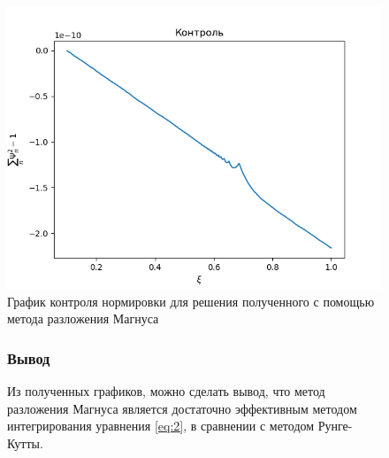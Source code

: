 \documentclass[utf8,9pt,mathserif,usepdftitle=false]{beamer}
\begin{document}
\begin{frame}
	\begin{figure}[h]
		
		\centering	
		\includegraphics[width=0.8\linewidth]{контроль_магнус}
		\caption{График контроля нормировки для решения полученного с помощью метода разложения Магнуса}
		
	\end{figure}
\end{frame}

\begin{frame}
	\begin{figure}[h]

	\frametitle{Вывод}
	Из полученных графиков, можно сделать вывод, что метод разложения Магнуса является достаточно эффективным методом интегрирования уравнения \eqref{eq:2}, в сравнении с методом Рунге-Кутты.
	
	\end{figure}
\end{frame}
\end{document}
